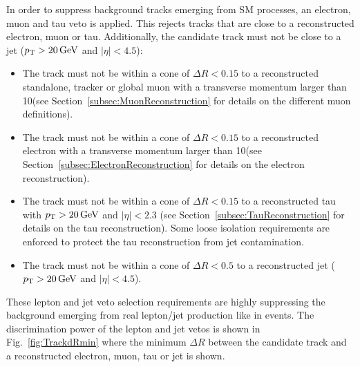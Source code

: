 In order to suppress background tracks emerging from SM processes, an electron, muon and tau veto is applied.
This rejects tracks that are close to a reconstructed electron, muon or tau.
Additionally, the candidate track must not be close to a jet ($p_{\text{T}}>20\,\text{Ge}\kern-0.06667em\text{V}$ and $|\eta|<4.5$):
\begin{itemize}
\renewcommand{\labelitemi}{\footnotesize{\ding{118}}}
\item The track must not be within a cone of $\Delta R<0.15$ to a reconstructed standalone, tracker or global muon with a transverse momentum larger than 10\gev (see Section~\ref{subsec:MuonReconstruction} for details on the different muon definitions).
\item The track must not be within a cone of $\Delta R<0.15$ to a reconstructed electron with a transverse momentum larger than 10\gev (see Section~\ref{subsec:ElectronReconstruction} for details on the electron reconstruction).
\item The track must not be within a cone of $\Delta R<0.15$ to a reconstructed tau with $p_{\text{T}}>20\,\text{Ge}\kern-0.06667em\text{V}$ and $|\eta|<2.3$ (see Section~\ref{subsec:TauReconstruction} for details on the tau reconstruction). 
      Some loose isolation requirements are enforced to protect the tau reconstruction from jet contamination.
\item The track must not be within a cone of $\Delta R< 0.5$ to a reconstructed jet ($p_{\text{T}}>20\,\text{Ge}\kern-0.06667em\text{V}$ and $|\eta|<4.5$).\\
\end{itemize}
These lepton and jet veto selection requirements are highly suppressing the background emerging from real lepton/jet production like in \WJets events.
The discrimination power of the lepton and jet vetos is shown in Fig.~\ref{fig:TrackdRmin} where the minimum $\Delta R$ between the candidate track and a reconstructed electron, muon, tau or jet is shown.\\
